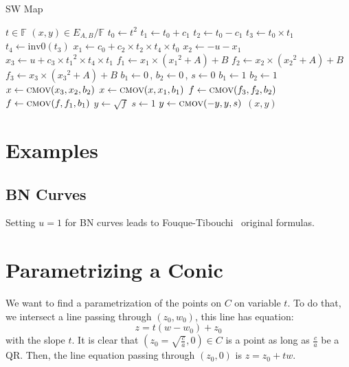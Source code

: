 \documentclass[letterpaper,11pt]{article}
\begin{document}
\begin{algorithm}[H]
\caption{SW Map}
  \begin{algorithmic}[1]
  \small
 \ENSURE $t\in \mathbb{F}$
 \REQUIRE  $(x,y)\in E_{A,B}/\mathbb{F}$
 \STATE $t_0 \leftarrow t^2$
 \STATE $t_1 \leftarrow t_0+c_1$
 \STATE $t_2 \leftarrow t_0-c_1$
 \STATE $t_3 \leftarrow t_0\times t_1$
 \STATE $t_4 \leftarrow \text{inv0}(t_3)$
 \STATE $x_1 \leftarrow c_0+c_2\times t_2\times t_4\times t_0$
 \STATE $x_2 \leftarrow -u-x_1 $
 \STATE $x_3 \leftarrow u+c_3\times {t_1}^2\times t_4\times t_1 $
 \STATE $f_1 \leftarrow x_1\times({x_1}^2+A)+B$
 \STATE $f_2 \leftarrow x_2\times({x_2}^2+A)+B$
 \STATE $f_3 \leftarrow x_3\times({x_3}^2+A)+B$
 \STATE $b_1\leftarrow 0$\,, $b_2\leftarrow 0$\,, $s\leftarrow 0$
    \STATE $b_1 \leftarrow 1$
 \ENDIF
    \STATE $b_2 \leftarrow 1$
 \ENDIF
 \STATE $x\leftarrow \textsc{cmov}(x_3,x_2,b_2)$
 \STATE $x\leftarrow \textsc{cmov}(x,x_1,b_1)$
 \STATE $f\leftarrow \textsc{cmov}(f_3,f_2,b_2)$
 \STATE $f\leftarrow \textsc{cmov}(f,f_1,b_1)$
 \STATE $y \leftarrow \sqrt{f} $
    \STATE $s\leftarrow 1$
 \ENDIF
 \STATE $y\leftarrow \textsc{cmov}(-y,y,s)$
 \RETURN $(x,y)$
 \end{algorithmic}
\end{algorithm}

\section{Examples}

\subsection{BN Curves}
Setting $u=1$ for BN curves leads to Fouque-Tibouchi~\cite{ft2012} original formulas.




\appendix
\section{Parametrizing a Conic}
\label{app:conic}

We want to find a  parametrization of the points on $C$ on variable $t$.
To do that, we intersect a line passing through $(z_0,w_0)$, this line has equation:
\begin{equation}
 z = t (w-w_0)+z_0
\end{equation}
with the slope $t$.
It is clear that $(z_0=\sqrt{\frac{c}{a}},0)\in C$ is a point as long as $\frac{c}{a}$ be a QR. Then, the line equation passing through $(z_0,0)$ is $z=z_0+tw$.
\end{document}
